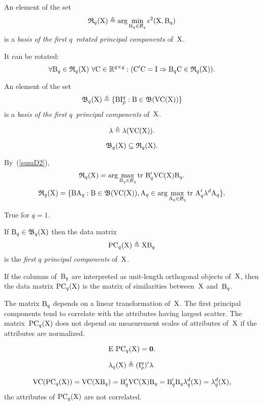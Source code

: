 \documentclass[10pt,a4paper]{article}
\theoremstyle{plain} \newtheorem{Lem}{Lemma}
\begin{document}
An element of the set
$$ \mathfrak R_q(\mathrm X) \triangleq \arg \min_{\mathrm B_q \in \mathcal B_q} \epsilon^2(\mathrm X, \mathrm B_q) $$
is a {\em basis of the first $q$~rotated principal components} of~$\mathrm X$.

It can be rotated:
$$ \forall \mathrm B_q \in \mathfrak R_q(\mathrm X) \ \forall \mathrm C \in \mathbb R^{q \times q}:
  (\mathrm C' \mathrm C = \mathrm I \Rightarrow \mathrm B_q \mathrm C \in \mathfrak R_q(\mathrm X)).
$$

An element of the set
$$ \mathfrak B_q(\mathrm X) \triangleq \{\mathrm B \mathrm I^q_p : \mathrm B \in \mathfrak B(\mathrm {VC}(\mathrm X)) \} $$
is a {\em basis of the first $q$~principal components} of~$\mathrm X$.

$$ \mathbf \lambda \triangleq \lambda(\mathrm {VC}(\mathrm X)). $$

$$ \mathfrak B_q(\mathrm X) \subseteq \mathfrak R_q(\mathrm X). $$
\proof
{
By~(\ref{sumD2}),
$$ \mathfrak R_q(\mathrm X) = \arg \max_{\mathrm B_q \in \mathcal B_q} \mathrm {tr} \  \mathrm B_q' \mathrm {VC} (\mathrm X) \mathrm B_q. $$
$$ \mathfrak R_q(\mathrm X) =
  \{ \mathrm B \mathrm A_q : \mathrm B \in \mathfrak B(\mathrm {VC}(\mathrm X)),
                       \mathrm A_q \in \arg \max_{\mathrm A_q \in \mathcal B_q} \mathrm {tr} \  \mathrm A_q' \mathbf \lambda^d \mathrm A_q
  \}.
$$


True for $q = 1$.
}

If $\mathrm B_q \in \mathfrak B_q(\mathrm X)$ then the data matrix
$$\mathrm {PC}_q(\mathrm X) \triangleq \mathrm X \mathrm B_q$$
is the {\em first $q$ principal components} of~$\mathrm X$.

If the columns of~$\mathrm B_q$ are interpreted as unit-length orthogonal objects of~$\mathrm X$,
then the data matrix $\mathrm {PC}_q(\mathrm X)$ is the matrix of similarities between~$\mathrm X$ and~$\mathrm B_q$.

The matrix $\mathrm B_q$ depends on a linear transformation of~$\mathrm X$.
The first principal components tend to correlate with the attributes having largest scatter.
The matrix~$\mathrm {PC}_q(\mathrm X)$ does not depend on measurement scales of attributes of~$\mathrm X$ if the attributes are normalized.

$$ \mathrm E \  \mathrm {PC}_q(\mathrm X) = \mathbf 0. $$

$$ \mathbf \lambda_q(\mathrm X) \triangleq (\mathrm I^q_p)' \mathbf \lambda. $$

$$ \mathrm {VC} (\mathrm {PC}_q(\mathrm X)) = \mathrm {VC} (\mathrm X \mathrm B_q)
                = \mathrm B_q' \mathrm {VC} (\mathrm X) \mathrm B_q
                = \mathrm B_q' \mathrm B_q \mathbf \lambda_q^d(\mathrm X)
                = \mathbf \lambda_q^d(\mathrm X),
$$
the attributes of $\mathrm {PC}_q(\mathrm X)$ are not correlated.
\end{document}
